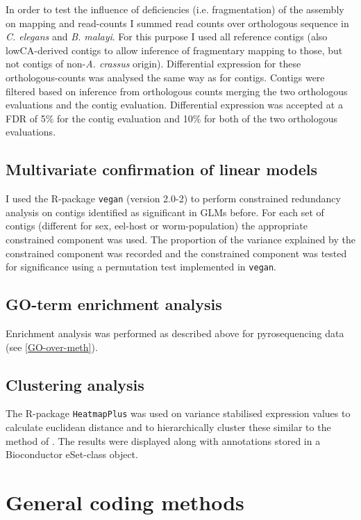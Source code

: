 In order to test the influence of deficiencies (i.e. fragmentation) of
the assembly on mapping and read-counts I summed read counts over
orthologous sequence in \textit{C. elegans} and
\textit{B. malayi}. For this purpose I used all reference contigs
(also lowCA-derived contigs to allow inference of fragmentary mapping
to those, but not contigs of non-\textit{A. crassus} origin).
Differential expression for these orthologous-counts was analysed the
same way as for contigs. Contigs were filtered based on inference
from orthologous counts merging the two orthologous evaluations and
the contig evaluation. Differential expression was accepted at a FDR
of 5\% for the contig evaluation and 10\% for both of the two
orthologous evaluations.

\subsection{Multivariate confirmation of linear models}
\label{sec:mult-conf-line}

I used the R-package \texttt{vegan} (version 2.0-2) to perform
constrained redundancy analysis on contigs identified as significant
in GLMs before. For each set of contigs (different for sex, eel-host
or worm-population) the appropriate constrained component was
used. The proportion of the variance explained by the constrained
component was recorded and the constrained component was tested for
significance using a permutation test implemented in \texttt{vegan}.

\subsection{GO-term enrichment analysis}

Enrichment analysis was performed as described above for
pyrosequencing data (see \ref{GO-over-meth}).

\subsection{Clustering analysis}

The R-package \texttt{HeatmapPlus} was used on variance stabilised
expression values to calculate euclidean distance and to hierarchically
cluster these similar to the method of \cite{pmid9843981}. The results
were displayed along with annotations stored in a Bioconductor
eSet-class object.

\section{General coding methods}

